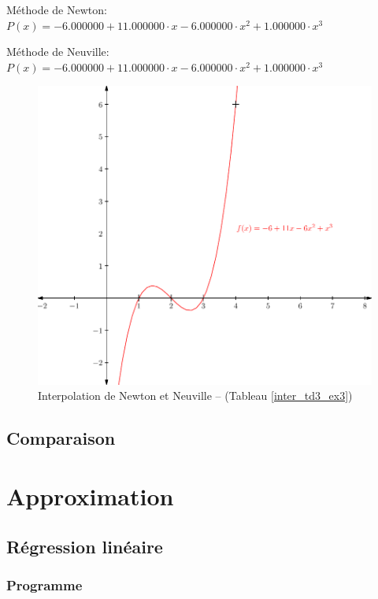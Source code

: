 \documentclass{report}
\begin{document}
      Méthode de Newton: $P(x)= -6.000000 + 11.000000 \cdot x- 6.000000 \cdot x^{2}  + 1.000000 \cdot x^{3} $

      Méthode de Neuville: $P(x)= -6.000000 + 11.000000 \cdot x- 6.000000 \cdot x^{2}  + 1.000000 \cdot x^{3} $
      
      \begin{figure}[h]
	\centering
	\includegraphics[scale=0.7]{graphiques/pdf_output/inter_test1.pdf}
	\caption{Interpolation de Newton et Neuville -- (Tableau \ref{inter_td3_ex3})}
      \end{figure}

      \renewcommand{\arraystretch}{2}
      \renewcommand{\arraystretch}{1}
    \section{Comparaison}
  \chapter{Approximation}
    \section{Régression linéaire}
      \subsection{Programme}
	
    \newpage
\end{document}
